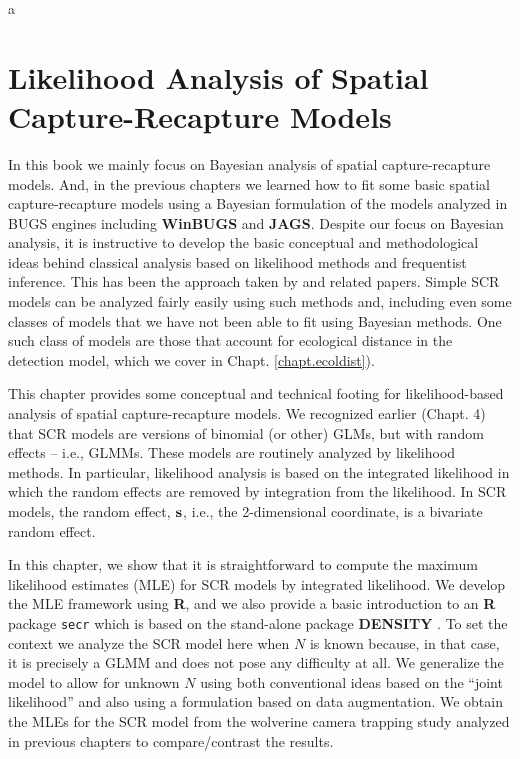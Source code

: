 a\chapter{
Likelihood Analysis of Spatial Capture-Recapture Models
}
\label{chapt.mle}


\vspace{.3in}



In this book we mainly focus on Bayesian analysis of spatial
capture-recapture models. And, in the previous chapters we learned how
to fit some basic spatial capture-recapture models using a Bayesian
formulation of the models analyzed in BUGS engines including {\bf
  WinBUGS} and {\bf JAGS}.  Despite our focus on Bayesian analysis, it
is instructive to develop the basic conceptual and methodological
ideas behind classical analysis based on likelihood methods and
frequentist inference.  
This has been the approach taken by
\citet{borchers_efford:2008, dawson_efford:2009} and related papers.
Simple SCR models can be analyzed
fairly easily using such methods and, including even some classes of
models that we have not been able to fit using Bayesian methods. One
such class of models are those
that account for ecological distance in the detection model,
which we cover in  Chapt. \ref{chapt.ecoldist}).


This chapter provides some conceptual and technical footing for
likelihood-based analysis of spatial capture-recapture models. We
recognized earlier (Chapt. 4) that SCR models are versions of
binomial (or other) GLMs, but with random effects – i.e., GLMMs. These
models are 
routinely analyzed by likelihood methods. In particular, likelihood
analysis is based on the integrated likelihood in which the random
effects are removed by integration from the likelihood. In SCR models,
the random effect, ${\bf s}$, i.e., the 2-dimensional coordinate, is a
bivariate random effect. 

In this chapter, we show that it is
straightforward to compute the maximum likelihood estimates (MLE) for
SCR models by integrated likelihood. We develop the MLE framework
using {\bf R}, and we also provide a basic introduction to an {\bf R} package
\mbox{\tt secr} \citep{efford:2011} which is based on the stand-alone
package 
{\bf DENSITY} \citep{efford_etal:2004}.
 To set the context we analyze the SCR model
here when $N$ is known because, in that case, it is precisely a GLMM and
does not pose any difficulty at all. We generalize the model to allow
for unknown $N$ using both conventional ideas based on the ``joint
likelihood'' \citep[e.g.,][]{borchers_etal:2002}
and also using a formulation
based on data augmentation.  We obtain the MLEs for 
the SCR model from the wolverine camera trapping study \citep{magoun_etal:2011}
 analyzed in previous chapters to compare/contrast the
results.

